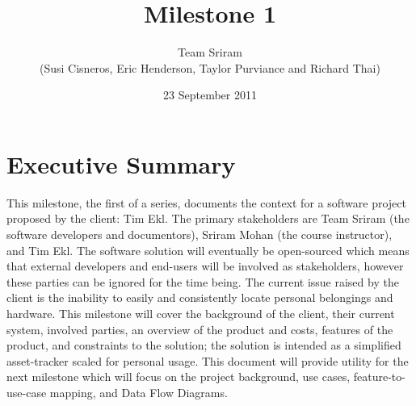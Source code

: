\documentclass{article}
\begin{document}
\setlength{\voffset}{3.5in}
\title{Milestone 1}
\author{Team Sriram\\
(Susi Cisneros, Eric Henderson, Taylor Purviance and Richard Thai)}
\date{23 September 2011}
\maketitle
\clearpage
\setlength{\voffset}{0pt}
\tableofcontents
\clearpage
\section{Executive Summary}
This milestone, the first of a series, documents the context for a software project proposed by the client: Tim Ekl. The primary stakeholders are Team Sriram (the software developers and documentors), Sriram Mohan (the course instructor), and Tim Ekl.  The software solution will eventually be open-sourced which means that external developers and end-users will be involved as stakeholders, however these parties can be ignored for the time being. The current issue raised by the client is the inability to easily and consistently locate personal belongings and hardware. This milestone will cover the background of the client, their current system, involved parties, an overview of the product and costs, features of the product, and constraints to the solution; the solution is intended as a simplified asset-tracker scaled for personal usage. This document will provide utility for the next milestone which will focus on the project background, use cases, feature-to-use-case mapping, and Data Flow Diagrams.
\end{document}
